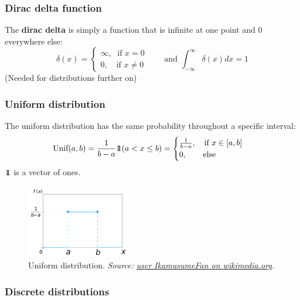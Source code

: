\documentclass[
]{book}
\begin{document}
\hypertarget{diracdelta}{%
\subsubsection{Dirac delta function}\label{diracdelta}}

The \textbf{dirac delta} is simply a function that is infinite at one point
and 0 everywhere else:
\[\delta(x)=\begin{cases} \infty , \; \text{ if } x = 0 \\0, \quad \text{if } x \neq 0 \end{cases} \qquad \text{and } \int_{-\infty}^{\infty} \delta(x) dx = 1\]
(Needed for distributions further on)

\hypertarget{uniform-distribution}{%
\subsubsection{Uniform distribution}\label{uniform-distribution}}

The uniform distribution has the same probability throughout a specific
interval:
\[\text{Unif}(a,b) = \frac{1}{b-a} 1 \mkern-6mu 1 (a < x \leq b) = \begin{cases} 
                \frac{1}{b-a}, \quad \text{if } x \in [ a,b ] \\
                0, \qquad \text{else}
            \end{cases}\] \(1 \mkern-6mu 1\) is a vector of ones.

\begin{figure}
\centering
\includegraphics[width=0.4\textwidth,height=\textheight]{./figures/Uniform_Distribution.png}
\caption{Uniform distribution. \emph{Source: \href{https://commons.wikimedia.org/wiki/File:Uniform_Distribution_PDF_SVG.svg}{user IkamusumeFan on
wikimedia.org}.}}
\end{figure}

\hypertarget{discrete-distributions}{%
\subsubsection{Discrete distributions}\label{discrete-distributions}}
\end{document}
